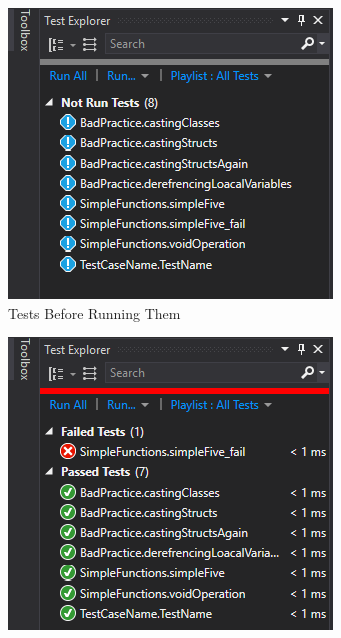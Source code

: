 \documentclass[12pt]{article}
\begin{document}
\begin{figure}[!ht]
	\centering
	\begin{subfigure}[t]{0.45\textwidth}
		\includegraphics[width=\textwidth]{not_run_tests.png}
		\caption{Tests Before Running Them}
	\end{subfigure}
	\begin{subfigure}[t]{0.45\textwidth}
		\includegraphics[width=\textwidth]{run_tests.png}

\end{subfigure}
\end{figure}
\end{document}
